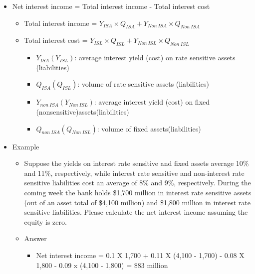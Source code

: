 \begin{itemize}
\item Net interest income = Total interest income - Total interest cost
    \begin{itemize}
    \item Total interest income = \(Y_{ISA} \times Q_{ISA} + Y_{Non \ ISA} \times Q_{Non \ ISA}\)
    \item Total interest cost = \(Y_{ISL} \times Q_{ISL} + Y_{Non \ ISL} \times Q_{Non \ ISL}\)
        \begin{itemize}
            \item \(Y_{ISA}(Y_{ISL})\): average interest yield (cost) on rate sensitive assets (liabilities)
          \item \(Q_{ISA}(Q_{ISL})\): volume of rate sensitive assets (liabilities)
          \item \(Y_{non \ ISA}(Y_{Non \ ISL})\): average interest yield (cost) on fixed (nonsensitive)assets(liabilities) 
          \item \(Q_{non \ ISA}(Q_{Non \ ISL})\): volume of fixed assets(liabilities)
        \end{itemize}
    \end{itemize}
\item Example
    \begin{itemize}
    \item Suppose the yields on interest rate sensitive and fixed assets average 10\% and 11\%, respectively, while interest rate sensitive and non-interest rate sensitive liabilities cost an average of 8\% and 9\%, respectively. During the coming week the bank holds \$1,700 million in interest rate sensitive assets (out of an asset total of \$4,100 million) and \$1,800 million in interest rate sensitive liabilities. Please calculate the net interest income assuming the equity is zero.
    \item Answer
        \begin{itemize}
        \item Net interest income = 0.1 X 1,700 + 0.11 X (4,100 - 1,700) - 0.08 X 1,800 - 0.09 x (4,100 - 1,800) = \$83 million
        \end{itemize}
    \end{itemize}

\end{itemize}


